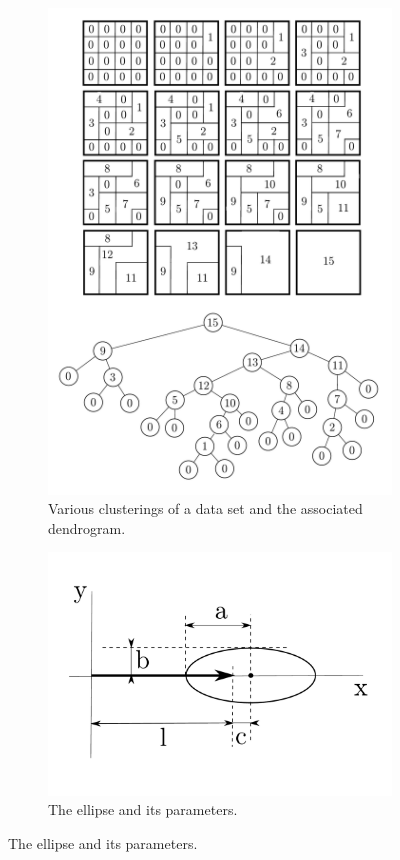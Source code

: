\begin{figure}[h]
	\centering
	\begin{subfigure}{0.5\textwidth}
		\includegraphics[width=\textwidth]{./illustrations/telea-dendrogram-embedded_font.pdf}
    	\caption{Various clusterings of a data set and the associated dendrogram.}
	\end{subfigure}
    \qquad
    \begin{subfigure}{0.4\textwidth}
		\includegraphics[width=\textwidth]{./illustrations/telea-ellipse_params-embedded_font.pdf}
    	\caption{The ellipse and its parameters.}
    

\end{subfigure}
\end{figure}
